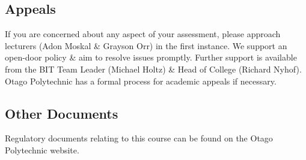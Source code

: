 \documentclass{article}
\begin{document}
\subsection*{Appeals}
If you are concerned about any aspect of your assessment, please approach lecturers (Adon Moskal \& Grayson Orr) in the first instance. We support an open-door policy \& aim to resolve issues promptly. Further support is available from the BIT Team Leader (Michael Holtz) \& Head of College (Richard Nyhof). Otago Polytechnic has a formal process for academic appeals if necessary.

\subsection*{Other Documents}
Regulatory documents relating to this course can be found on the Otago Polytechnic website.
\end{document}
